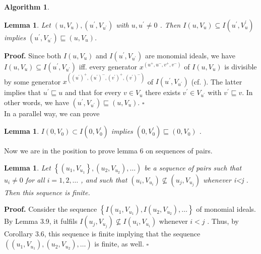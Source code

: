 \documentclass{article}
\theoremstyle{plain}
\newtheorem{lemma}[theorem]{Lemma}
\theoremstyle{definition}
\newtheorem{algorithm}[theorem]{Algorithm}
\begin{document}
\begin{algorithm}
\begin{lemma}Let  $\left(u, V_{u}\right),\left(u^{\prime}, V_{u^{\prime}}\right) $ with  $u, u^{\prime} \neq 0$ . Then  $I\left(u, V_{u}\right) \subseteq I\left(u^{\prime}, V_{u}^{\prime}\right)$  implies  $\left(u^{\prime}, V_{u^{\prime}}\right) \sqsubseteq\left(u, V_{u}\right) $.
\end{lemma}
\noindent\textbf{Proof.} Since both $ I\left(u, V_{u}\right)$  and $ I\left(u^{\prime}, V_{u^{\prime}}\right)$  are monomial ideals, we have  $I\left(u, V_{u}\right) \subseteq I\left(u^{\prime}, V_{u^{\prime}}\right)  $ iff. every generator  $x^{\left(u^{+}, u^{-}, v^{+}, v^{-}\right)}$ of  $I\left(u, V_{u}\right)$  is divisible by some generator  $x^{\left(\left(u^{\prime}\right)^{+},\left(u^{\prime}\right)^{-},\left(v^{\prime}\right)^{+},\left(v^{\prime}\right)^{-}\right)}$ of  $I\left(u^{\prime}, V_{u^{\prime}}\right)$  (cf. \cite{ref3}). The latter implies that  $u^{\prime} \sqsubseteq u$  and that for every  $v \in V_{u}$  there exists  $v^{\prime} \in V_{u^{\prime}}$  with $ v^{\prime} \sqsubseteq v$. In other words, we have  $\left(u^{\prime}, V_{u^{\prime}}\right) \sqsubseteq\left(u, V_{u}\right)$. \hfill$\square$\\

In a parallel way,  we can prove 

\begin{lemma}$I\left(0, V_{0}\right) \subset I\left(0, V_{0}^{\prime}\right)$ implies $\left(0, V_{0}^{\prime}\right) \sqsubseteq\left(0, V_{0}\right) $ .\end{lemma}

Now we are in the position to prove lemma 6 on sequences of pairs. \\

\begin{lemma}Let  $\left\{\left(u_{1}, V_{u_{1}}\right\},\left(u_{2}, V_{u_{2}}\right), \ldots\right)$  be a sequence of pairs such that  $u_{i} \neq 0$  for all $ i=1,2, \ldots$ , and such that  $\left(u_{i}, V_{u_{i}}\right) \nsubseteq\left(u_{j}, V_{u_{j}}\right)$  whenever  i<j . Then this sequence is finite.\end{lemma}

\noindent \textbf{Proof.} Consider the sequence  $\left\{I\left(u_{1}, V_{u_{1}}\right), I\left(u_{2}, V_{u_{2}}\right), \ldots\right\}$  of monomial ideals. By Lemma 3.9, it fulfils  $I\left(u_{j}, V_{u_{j}}\right) \nsubseteq I\left(u_{i}, V_{u_{i}}\right)$  whenever $ i<j$ . Thus, by Corollary 3.6, this sequence is finite implying that the sequence  $\left(\left(u_{1}, V_{u_{1}}\right),\left(u_{2}, V_{u_{2}}\right), \ldots\right)$  is finite, as well. \hfill$\square$ \\


\end{algorithm}
\end{document}
